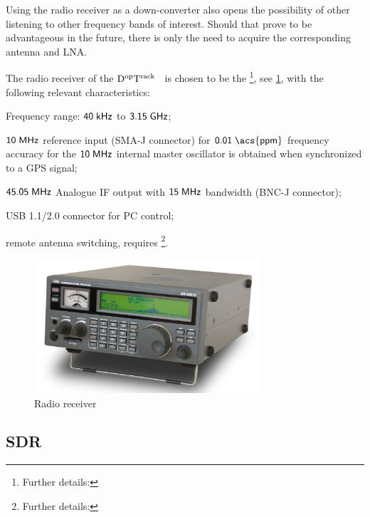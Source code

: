 \documentclass[11pt,a4paper,oneside]{article}
\newcommand{\GroundStationName}{${\rm D^{\rm op}T^{\rm rack}}$}
\newcommand{\semitextwidth}{0.75\textwidth}
\newcommand{\listskip}{0pt}
\newenvironment{itemize*}
{\begin{itemize}
  \setlength{\itemsep}{\listskip}
  \setlength{\parskip}{\listskip}
  \setlength{\parsep}{\listskip}}
{\end{itemize}}
\newcommand{\unit}[2]{$ {\sf #1}\thickspace{\sf #2}$}
\begin{document}
Using the radio receiver as a down-converter also opens the possibility of other listening to other frequency bands of interest. Should that prove to be advantageous in the future, there is only the need to acquire the corresponding antenna and \ac{LNA}.

The radio receiver of the \GroundStationName~ is chosen to be the \footnote{Further details: }, see \ref{fig:radio}, with the following relevant characteristics:

\begin{itemize*}
\item Frequency range: \unit{40}{kHz} to \unit{3.15}{GHz};
\item \unit{10}{MHz} reference input (SMA-J connector) for \unit{0.01}{\acs{ppm}} frequency accuracy for the \unit{10}{MHz} internal master oscillator is obtained when synchronized to a \ac{GPS} signal;
\item \unit{45.05}{MHz} Analogue \ac{IF} output with \unit{15}{MHz} bandwidth (BNC-J connector);
\item \ac{USB} 1.1/2.0 connector for \ac{PC} control;
\item remote antenna switching, requires \footnote{Further details:  }.
\end{itemize*}

\begin{figure}[!ht]
\centering
\includegraphics[width=\semitextwidth]{radio}
\caption{Radio receiver}
\label{fig:radio}
\end{figure}



\subsection{\acs{SDR}}
\end{document}
